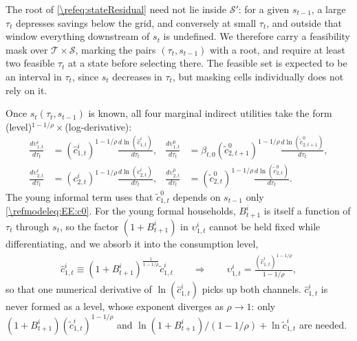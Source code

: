 The root of \eqref{\refeq:stateResidual} need not lie inside $\mathcal{S}'$: for a given $s_{t-1}$, a large $\tau_t$ depresses savings below the grid, and conversely at small $\tau_t$, and outside that window everything downstream of $s_t$ is undefined. We therefore carry a feasibility mask over $\mathcal{T}\times\mathcal{S}$, marking the pairs $(\tau_t, s_{t-1})$ with a root, and require at least two feasible $\tau_t$ at a state before selecting there. The feasible set is expected to be an interval in $\tau_t$, since $s_t$ decreases in $\tau_t$, but masking cells individually does not rely on it.

Once $s_t(\tau_t,s_{t-1})$ is known, all four marginal indirect utilities take the form (level)$^{1-1/\rho}\times$(log-derivative):
\begin{subequations}\label{\refeq:PEEcrraTerms}
\begin{align}
    \frac{d\upsilon_{1,t}^i}{d\tau_t} &= \left(\hat{c}_{1,t}^i\right)^{1-1/\rho}\frac{d\ln\left(\hat{c}_{1,t}^i\right)}{d\tau_t}, &
    \frac{d\upsilon_{1,t}^0}{d\tau_t} &= \beta_{t,0}\left(\tilde{c}_{2,t+1}^0\right)^{1-1/\rho}\frac{d\ln\left(\tilde{c}_{2,t+1}^0\right)}{d\tau_t}, \\
    \frac{d\upsilon_{2,t}^i}{d\tau_t} &= \left(c_{2,t}^i\right)^{1-1/\rho}\frac{d\ln\left(c_{2,t}^i\right)}{d\tau_t}, &
    \frac{d\upsilon_{2,t}^0}{d\tau_t} &= \left(\tilde{c}_{2,t}^0\right)^{1-1/\rho}\frac{d\ln\left(\tilde{c}_{2,t}^0\right)}{d\tau_t}.
\end{align}
\end{subequations}
The young informal term uses that $\tilde{c}_{1,t}^0$ depends on $s_{t-1}$ only \eqref{\refmodeleq:EE:c0}. For the young formal households, $B_{t+1}^i$ is itself a function of $\tau_t$ through $s_t$, so the factor $(1+B_{t+1}^i)$ in $\upsilon_{1,t}^i$ cannot be held fixed while differentiating, and we absorb it into the consumption level,
\begin{align}\label{\refeq:hatc1i}
    \hat{c}_{1,t}^i \equiv \left(1+B_{t+1}^i\right)^{\frac{1}{1-1/\rho}}\tilde{c}_{1,t}^i \qquad\Longrightarrow\qquad \upsilon_{1,t}^i = \frac{\left(\hat{c}_{1,t}^i\right)^{1-1/\rho}}{1-1/\rho},
\end{align}
so that one numerical derivative of $\ln(\hat{c}_{1,t}^i)$ picks up both channels. $\hat{c}_{1,t}^i$ is never formed as a level, whose exponent diverges as $\rho\rightarrow 1$: only $\left(1+B_{t+1}^i\right)\left(\tilde{c}_{1,t}^i\right)^{1-1/\rho}$ and $\ln\left(1+B_{t+1}^i\right)/(1-1/\rho)+\ln\tilde{c}_{1,t}^i$ are needed.

